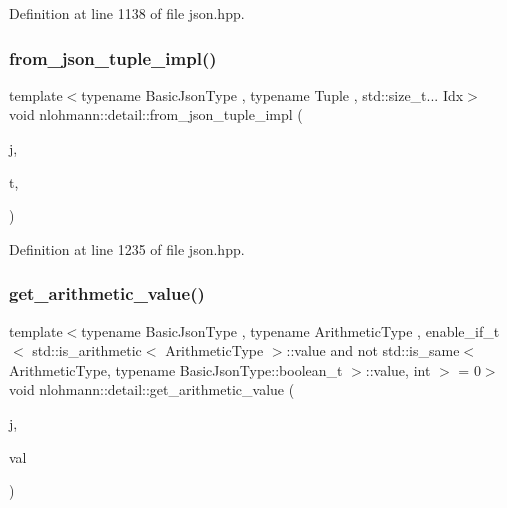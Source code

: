 Definition at line 1138 of file json.\+hpp.

\mbox{\label{namespacenlohmann_1_1detail_a28253915d9db4a0112d60eaee0422949}} 
\subsubsection{\texorpdfstring{from\+\_\+json\+\_\+tuple\+\_\+impl()}{from\_json\_tuple\_impl()}}
{\footnotesize\ttfamily template$<$typename Basic\+Json\+Type , typename Tuple , std\+::size\+\_\+t... Idx$>$ \\
void nlohmann\+::detail\+::from\+\_\+json\+\_\+tuple\+\_\+impl (\begin{DoxyParamCaption}\item[{const Basic\+Json\+Type \&}]{j,  }\item[{Tuple \&}]{t,  }\item[{\hyperlink{structnlohmann_1_1detail_1_1index__sequence}{index\+\_\+sequence}$<$ Idx... $>$}]{ }\end{DoxyParamCaption})}



Definition at line 1235 of file json.\+hpp.

\mbox{\label{namespacenlohmann_1_1detail_a85955b9c6dd31846e4b8e891f78614b6}} 
\subsubsection{\texorpdfstring{get\+\_\+arithmetic\+\_\+value()}{get\_arithmetic\_value()}}
{\footnotesize\ttfamily template$<$typename Basic\+Json\+Type , typename Arithmetic\+Type , enable\+\_\+if\+\_\+t$<$ std\+::is\+\_\+arithmetic$<$ Arithmetic\+Type $>$\+::value and not std\+::is\+\_\+same$<$ Arithmetic\+Type, typename Basic\+Json\+Type\+::boolean\+\_\+t $>$\+::value, int $>$  = 0$>$ \\
void nlohmann\+::detail\+::get\+\_\+arithmetic\+\_\+value (\begin{DoxyParamCaption}\item[{const Basic\+Json\+Type \&}]{j,  }\item[{Arithmetic\+Type \&}]{val }\end{DoxyParamCaption})}



